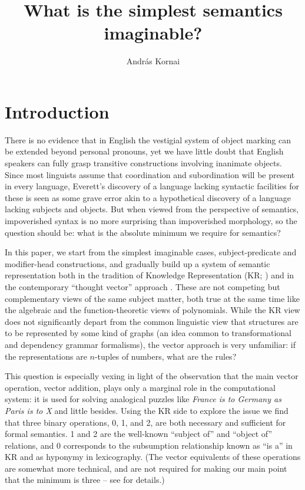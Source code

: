 \documentclass[output=paper]{langscibook}
\author{András Kornai\orcid{0000-0001-6078-6840}\affiliation{Budapest University of Technology and Economics}}
\title{What is the simplest semantics imaginable?}
\begin{document}
\maketitle

\section{Introduction}

There is no evidence that in English the vestigial system of object marking can
be extended beyond personal pronouns, yet we have little doubt that English
speakers can fully grasp transitive constructions involving inanimate
objects. Since most linguists assume that coordination and subordination will
be present in every language, Everett's discovery of a language lacking
syntactic facilities for these is seen as some grave error akin to a
hypothetical discovery of a language lacking subjects and objects. But when
viewed from the perspective of semantics, impoverished syntax is no more
surprising than impoverished morphology, so the question should be: what is
the absolute minimum we require for semantics?

In this paper, we start from the simplest imaginable cases, subject-predicate
and modifier-head constructions, and gradually build up a system of semantic
representation both in the tradition of Knowledge Representation (KR; 
\cite{Brachman:2004}) and in the contemporary ``thought vector'' approach
\citep{LeCun:2015,Kornai:2022}. These are not competing but complementary
views of the same subject matter, both true at the same time like the
algebraic and the function-theoretic views of polynomials. While the KR view
does not significantly depart from the common linguistic view that
structures are to be represented by some kind of graphs (an idea common to
transformational and dependency grammar formalisms), the vector approach is
very unfamiliar: if the representations are $n$-tuples of numbers, what are
the rules?

This question is especially vexing in light of the observation that the main
vector operation, vector addition, plays only a marginal role in the
computational system: it is used for solving analogical puzzles like 
\textit{France is to Germany as Paris is to X} \citep{Mikolov:2013l} and little
besides. Using the KR side to explore the issue we find that three binary
operations, 0, 1, and 2, are both necessary and sufficient for formal
semantics. 1 and 2 are the well-known ``subject of'' and ``object of''
relations, and 0 corresponds to the subsumption relationship known as ``is a''
in KR and as hyponymy in lexicography. (The vector equivalents of these
operations are somewhat more technical, and are not required for making our
main point that the minimum is three -- see \citet{Kornai:2022} for details.)
\end{document}
